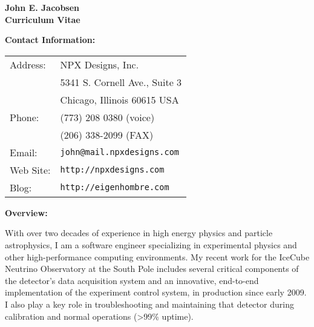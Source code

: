

\addtolength{\textheight}{1.5in}
\setlength{\voffset}{-0.5in}
\addtolength{\textwidth}{1in}
\setlength{\hoffset}{-0.5in}

\pagestyle{empty}
\parindent=0.0cm
\parskip=0.25cm

\newcommand{\etal}{{\it et.~al.}}
\newcommand{\remember}[1]{{\bf Remember: \{#1\}}}




\begin{center} 
{\Large\bf John E. Jacobsen}\\[0.3cm]
{\bf\Large Curriculum Vitae}
\end{center}
\vspace{1.0cm}


{\bf Contact Information:}

\begin{center}
\begin{tabular}[t]{ll}

Address:   & NPX Designs, Inc. \\
	   & 5341 S. Cornell Ave., Suite 3 \\
	   & Chicago, Illinois 60615 USA\\[0.25cm]

Phone: & (773) 208 0380 (voice) \\
       & (206) 338-2099 (FAX)\\[0.25cm]

Email: & {\tt john@mail.npxdesigns.com}\\
Web Site: & {\tt http://npxdesigns.com }\\
Blog: & {\tt http://eigenhombre.com }

\end{tabular}
\end{center}

\vspace{0.5cm}

{\bf Overview:}

With over two decades of experience in high energy physics and particle astrophysics, I am a software engineer specializing in experimental physics and other high-performance computing environments.  My recent work for the IceCube Neutrino Observatory at the South Pole includes several critical components of the detector's data acquisition system and an innovative, end-to-end implementation of the experiment control system, in production since early 2009.  I also play a key role in troubleshooting and maintaining that detector during calibration and normal operations (\textgreater 99\% uptime).

